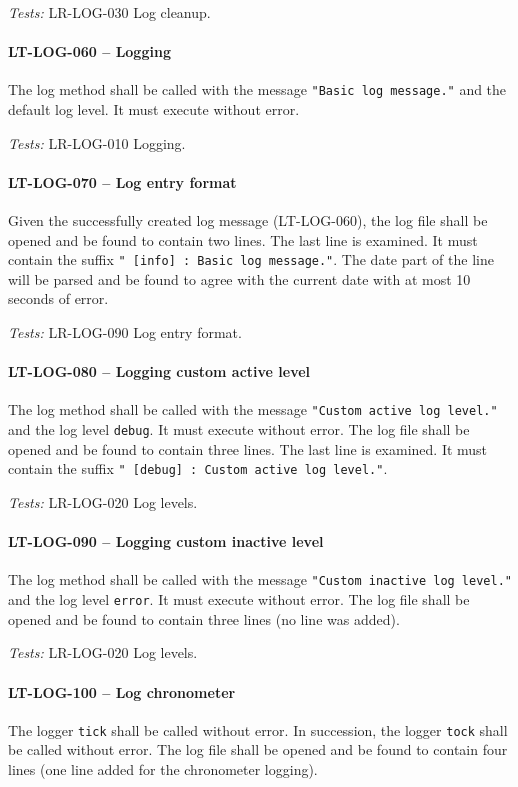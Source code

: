 \textit{Tests: } LR-LOG-030 Log cleanup.

\paragraph{LT-LOG-060 -- Logging}
The log method shall be called with the message
\lstinline{"Basic log message."} and the default log level.
It must execute without error.

\textit{Tests: } LR-LOG-010 Logging.

\paragraph{LT-LOG-070 -- Log entry format}
Given the successfully created log message (LT-LOG-060),
the log file shall be opened and be found to contain two lines.
The last line is examined. It must contain the suffix
\lstinline{" [info] : Basic log message."}.
The date part of the line will be parsed and be found to agree
with the current date with at most 10 seconds of error.

\textit{Tests: } LR-LOG-090 Log entry format.

\paragraph{LT-LOG-080 -- Logging custom active level}
The log method shall be called with the message
\lstinline{"Custom active log level."} and the log level
\lstinline{debug}. It must execute without error.
The log file shall be opened and be found to contain three lines.
The last line is examined. It must contain the suffix
\lstinline{" [debug] : Custom active log level."}.

\textit{Tests: } LR-LOG-020 Log levels.

\paragraph{LT-LOG-090 -- Logging custom inactive level}
The log method shall be called with the message
\lstinline{"Custom inactive log level."} and the log level
\lstinline{error}. It must execute without error.
The log file shall be opened and be found to contain three lines
(no line was added).

\textit{Tests: } LR-LOG-020 Log levels.

\paragraph{LT-LOG-100 -- Log chronometer}
The logger \lstinline{tick} shall be called without error.
In succession, the logger \lstinline{tock} shall be called without error.
The log file shall be opened and be found to contain four lines
(one line added for the chronometer logging).

